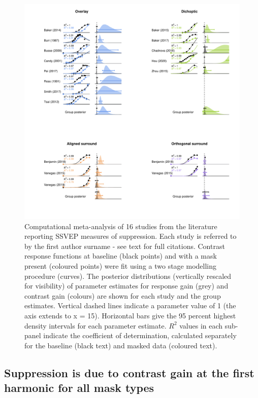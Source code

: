 \documentclass[]{article}
\begin{document}
\begin{figure}

{\centering \includegraphics{figures/metaanalysis} 

}

\caption{Computational meta-analysis of 16 studies from the literature reporting SSVEP measures of suppression. Each study is referred to by the first author surname - see text for full citations. Contrast response functions at baseline (black points) and with a mask present (coloured points) were fit using a two stage modelling procedure (curves). The posterior distributions (vertically rescaled for visibility) of parameter estimates for response gain (grey) and contrast gain (colours) are shown for each study and the group estimates. Vertical dashed lines indicate a parameter value of 1 (the axis extends to x = 15). Horizontal bars give the 95 percent highest density intervals for each parameter estimate. $R^2$ values in each sub-panel indicate the coefficient of determination, calculated separately for the baseline (black text) and masked data (coloured text).}\label{fig:metaanalysis}
\end{figure}

\hypertarget{suppression-is-due-to-contrast-gain-at-the-first-harmonic-for-all-mask-types}{%
\subsection{Suppression is due to contrast gain at the first harmonic for all mask types}\label{suppression-is-due-to-contrast-gain-at-the-first-harmonic-for-all-mask-types}}
\end{document}
